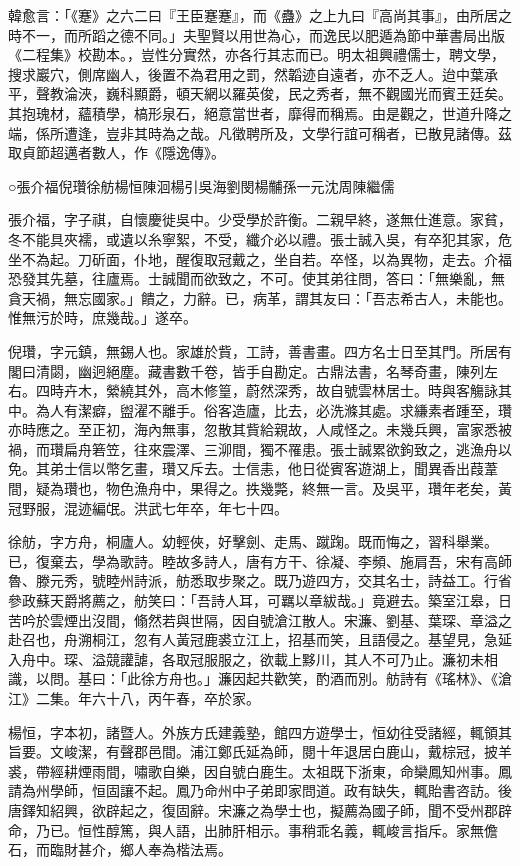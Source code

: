 
\begin{pinyinscope}
韓愈言：「《蹇》之六二曰『王臣蹇蹇』，而《蠱》之上九曰『高尚其事』，由所居之時不一，而所蹈之德不同。」夫聖賢以用世為心，而逸民以肥遁為節中華書局出版《二程集》校勘本。，豈性分實然，亦各行其志而已。明太祖興禮儒士，聘文學，搜求巖穴，側席幽人，後置不為君用之罰，然韜迹自遠者，亦不乏人。迨中葉承平，聲教淪浹，巍科顯爵，頓天網以羅英俊，民之秀者，無不觀國光而賓王廷矣。其抱瑰材，蘊積學，槁形泉石，絕意當世者，靡得而稱焉。由是觀之，世道升降之端，係所遭逢，豈非其時為之哉。凡徵聘所及，文學行誼可稱者，已散見諸傳。茲取貞節超邁者數人，作《隱逸傳》。

○張介福倪瓚徐舫楊恒陳洄楊引吳海劉閔楊黼孫一元沈周陳繼儒

張介福，字子祺，自懷慶徙吳中。少受學於許衡。二親早終，遂無仕進意。家貧，冬不能具夾襦，或遺以糸寧絮，不受，纖介必以禮。張士誠入吳，有卒犯其家，危坐不為起。刀斫面，仆地，醒復取冠戴之，坐自若。卒怪，以為異物，走去。介福恐發其先墓，往廬焉。士誠聞而欲致之，不可。使其弟往問，答曰：「無樂亂，無貪天禍，無忘國家。」饋之，力辭。已，病革，謂其友曰：「吾志希古人，未能也。惟無污於時，庶幾哉。」遂卒。

倪瓚，字元鎮，無錫人也。家雄於貲，工詩，善書畫。四方名士日至其門。所居有閣曰清閟，幽迥絕塵。藏書數千卷，皆手自勘定。古鼎法書，名琴奇畫，陳列左右。四時卉木，縈繞其外，高木修篁，蔚然深秀，故自號雲林居士。時與客觴詠其中。為人有潔癖，盥濯不離手。俗客造廬，比去，必洗滌其處。求縑素者踵至，瓚亦時應之。至正初，海內無事，忽散其貲給親故，人咸怪之。未幾兵興，富家悉被禍，而瓚扁舟箬笠，往來震澤、三泖間，獨不罹患。張士誠累欲鉤致之，逃漁舟以免。其弟士信以幣乞畫，瓚又斥去。士信恚，他日從賓客遊湖上，聞異香出葭葦間，疑為瓚也，物色漁舟中，果得之。抶幾斃，終無一言。及吳平，瓚年老矣，黃冠野服，混迹編氓。洪武七年卒，年七十四。

徐舫，字方舟，桐廬人。幼輕俠，好擊劍、走馬、蹴踘。既而悔之，習科舉業。已，復棄去，學為歌詩。睦故多詩人，唐有方干、徐凝、李頻、施肩吾，宋有高師魯、滕元秀，號睦州詩派，舫悉取步聚之。既乃遊四方，交其名士，詩益工。行省參政蘇天爵將薦之，舫笑曰：「吾詩人耳，可羈以章紱哉。」竟避去。築室江皋，日苦吟於雲煙出沒間，翛然若與世隔，因自號滄江散人。宋濂、劉基、葉琛、章溢之赴召也，舟溯桐江，忽有人黃冠鹿裘立江上，招基而笑，且語侵之。基望見，急延入舟中。琛、溢競讙謔，各取冠服服之，欲載上黟川，其人不可乃止。濂初未相識，以問。基曰：「此徐方舟也。」濂因起共歡笑，酌酒而別。舫詩有《瑤林》、《滄江》二集。年六十八，丙午春，卒於家。

楊恒，字本初，諸暨人。外族方氏建義塾，館四方遊學士，恒幼往受諸經，輒領其旨要。文峻潔，有聲郡邑間。浦江鄭氏延為師，閱十年退居白鹿山，戴棕冠，披羊裘，帶經耕煙雨間，嘯歌自樂，因自號白鹿生。太祖既下浙東，命欒鳳知州事。鳳請為州學師，恒固讓不起。鳳乃命州中子弟即家問道。政有缺失，輒貽書咨訪。後唐鐸知紹興，欲辟起之，復固辭。宋濂之為學士也，擬薦為國子師，聞不受州郡辟命，乃已。恒性醇篤，與人語，出肺肝相示。事稍乖名義，輒峻言指斥。家無儋石，而臨財甚介，鄉人奉為楷法焉。


\end{pinyinscope}
